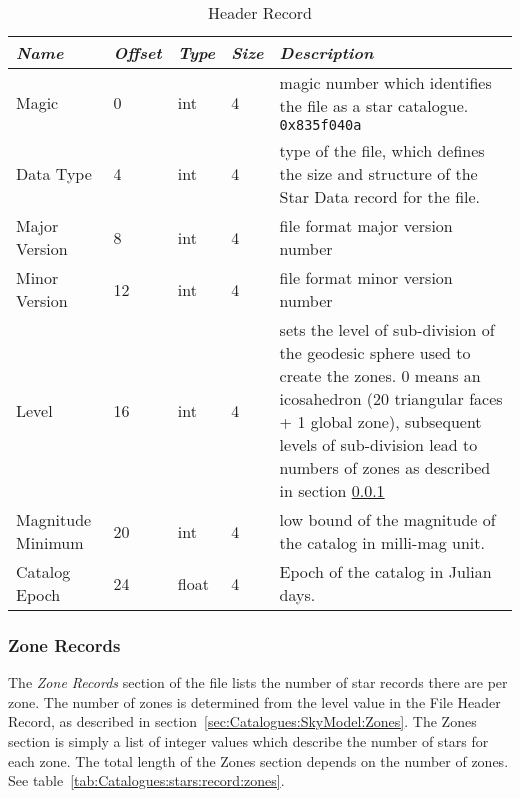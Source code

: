 \begin{table}[htbp]
\begin{tabularx}{\textwidth}{llllX}\toprule
\emph{Name} & \emph{Offset} & \emph{Type} & \emph{Size} & \emph{Description}\\\midrule
Magic             &  0 & int   & 4 & magic number which identifies the file as a star catalogue. \texttt{0x835f040a}\\%
Data Type         &  4 & int   & 4 & type of the file, which defines the size and structure 
                                   of the Star Data record for the file.\\%
Major Version     &  8 & int   & 4 & file format major version number\\%
Minor Version     & 12 & int   & 4 & file format minor version number\\%
Level             & 16 & int   & 4 & sets the level of sub-division of the geodesic sphere used to create the zones. 
                                   0 means an icosahedron (20 triangular faces + 1 global zone), 
                                   subsequent levels of sub-division lead to numbers of zones 
                                   as described in section \ref{sec:Catalogues:stars:record:zone}\\%
Magnitude Minimum & 20 & int   & 4 &  low bound of the magnitude of the catalog in milli-mag unit.  \\%
Catalog Epoch     & 24 & float & 4 &  Epoch of the catalog in Julian days.\\%
\end{tabularx}
\caption{Header Record}
\label{tab:Catalogues:stars:record:header}
\end{table}

\subsubsection{Zone Records}%
\label{sec:Catalogues:stars:record:zone}

The \emph{Zone Records} section of the file lists the number of star
records there are per zone. The number of zones is determined from the
level value in the File Header Record, as described in
section~\ref{sec:Catalogues:SkyModel:Zones}. The Zones section is
simply a list of integer values which describe the number of stars for
each zone. The total length of the Zones section depends on the number
of zones. See table~\ref{tab:Catalogues:stars:record:zones}.


